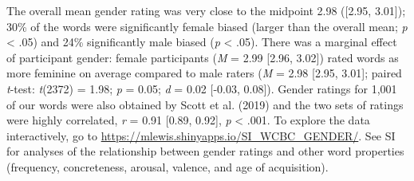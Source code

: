 \documentclass[
  english,
  ,man,floatsintext]{apa6}
\begin{document}
The overall mean gender rating was very close to the midpoint 2.98 ({[}2.95, 3.01{]}); 30\% of the words were significantly female biased (larger than the overall mean; \emph{p} \textless{} .05) and 24\% significantly male biased (\emph{p} \textless{} .05). There was a marginal effect of participant gender: female participants (\emph{M} = 2.99 {[}2.96, 3.02{]}) rated words as more feminine on average compared to male raters (\emph{M} = 2.98 {[}2.95, 3.01{]}; paired \emph{t}-test: \emph{t}(2372) = 1.98; \emph{p} = 0.05; \emph{d} = 0.02 {[}-0.03, 0.08{]}). Gender ratings for 1,001 of our words were also obtained by Scott et al. (2019) and the two sets of ratings were highly correlated, \emph{r} = 0.91 {[}0.89, 0.92{]}, \emph{p} \textless{} .001. To explore the data interactively, go to \url{https://mlewis.shinyapps.io/SI_WCBC_GENDER/}. See SI for analyses of the relationship between gender ratings and other word properties (frequency, concreteness, arousal, valence, and age of acquisition).
\end{document}
